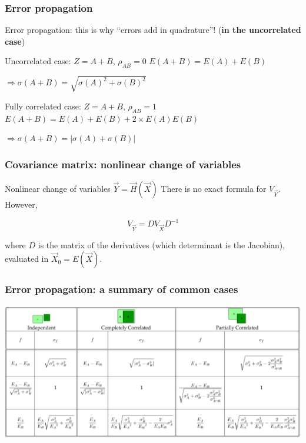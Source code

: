 \documentclass[9pt]{beamer}
\begin{document}
\begin{frame}
  \frametitle{Error propagation}
  
  \begin{alertblock}{}
   Error propagation: this is why ``errors add in quadrature''! (\textbf{in the uncorrelated case})
  \end{alertblock}
  
  \begin{block}{Uncorrelated case: $Z = A+B$, $\rho_{AB} = 0$}
   $E(A+B) = E(A) + E(B)$
   
   $\Rightarrow \sigma(A+B) = \sqrt{\sigma(A)^2 + \sigma(B)^2}$
  \end{block}

  \begin{block}{Fully correlated case: $Z = A+B$, $\rho_{AB} = 1$}
   $E(A+B) = E(A) + E(B) + 2 \times E(A) E(B)$
   
   $\Rightarrow \sigma(A+B) = |\sigma(A) + \sigma(B)|$
  \end{block}


\end{frame}

 
 \begin{frame}
\frametitle{Covariance matrix: nonlinear change of variables}

 \begin{block}{Nonlinear change of variables $\vec{Y} = \vec{H} (\vec{X})$}
  There is no exact formula for $V_{\vec{Y}}$. However,
  
  $$V_{\vec{Y}} = D V_{\vec{X}} D^{-1}$$
  
  where $D$ is the matrix of the derivatives (which determinant is the Jacobian), evaluated in $\vec{X}_0 = E(\vec{X})$.
 \end{block}


\end{frame}

\begin{frame}
 \frametitle{Error propagation: a summary of common cases}
 
 \includegraphics[width=1.1\textwidth]{propagation_errors_table.png}
\end{frame}
\end{document}
